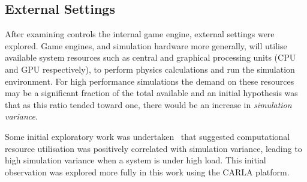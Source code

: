 \documentclass[letterpaper, 10 pt, journal, twoside]{IEEEtran}
\begin{document}


\subsection{External Settings}

After examining controls the internal game engine, external settings were explored. 
%
Game engines, and simulation hardware more generally, will utilise available system resources such as central and graphical processing units (CPU and GPU respectively), to perform physics calculations and run the simulation environment. 
%
For high performance simulations the demand on these resources may be a significant fraction of the total available and an initial hypothesis was that as this ratio tended toward one, there would be an increase in \textit{simulation variance}.

Some initial exploratory work was undertaken~\cite{TSLUnrealEngineTesting} that suggested computational resource utilisation was positively correlated with simulation variance, leading to high simulation variance when a system is under high load. This initial observation was explored more fully in this work using the CARLA platform. 

\end{document}
